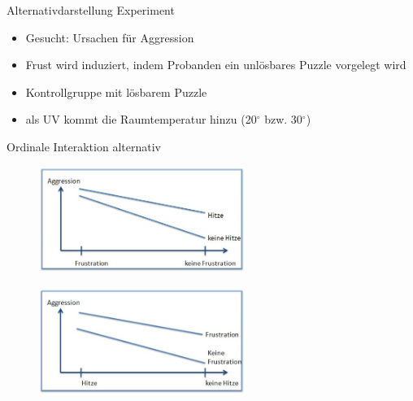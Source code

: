 \documentclass{beamer}
\begin{document}
	\begin{frame}{Alternativdarstellung}
		Experiment
		\begin{itemize}
			\item Gesucht: Ursachen für Aggression
			\item Frust wird induziert, indem Probanden ein unlösbares Puzzle vorgelegt wird
			\item Kontrollgruppe mit lösbarem Puzzle
			\item als UV kommt die Raumtemperatur hinzu (20$^{\circ}$ bzw. 30$^{\circ}$)
		\end{itemize}
	\end{frame}
	
	\begin{frame}{Ordinale Interaktion alternativ}
		\begin{figure}
			\centering
			\includegraphics[width=0.6\textwidth]{Bilder/OrdinaleInteraktion1.jpg}
		\end{figure}
		\begin{figure}
			\centering
			\includegraphics[width=0.6\textwidth]{Bilder/OrdinaleInteraktion2.jpg}
		\end{figure}
	\end{frame}
	
\end{document}
